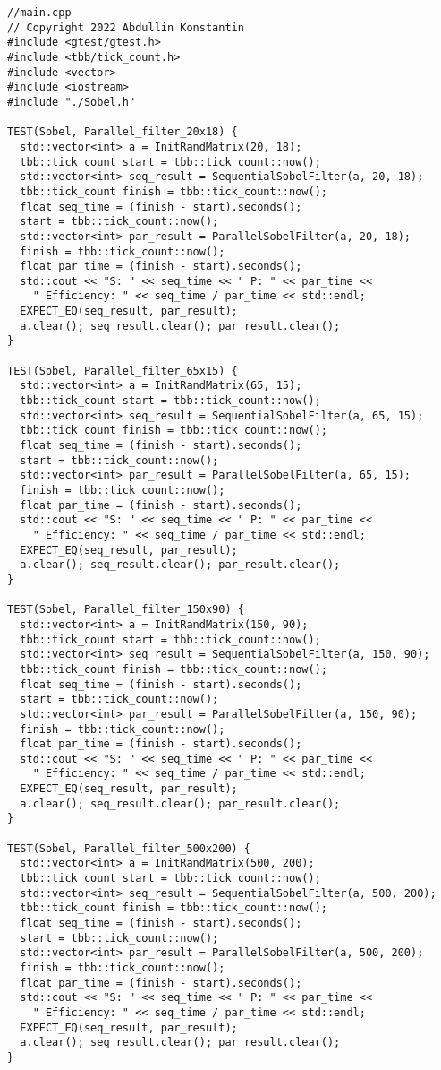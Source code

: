 \documentclass[12pt]{article}
\begin{document}
\begin{lstlisting}
//main.cpp
// Copyright 2022 Abdullin Konstantin
#include <gtest/gtest.h>
#include <tbb/tick_count.h>
#include <vector>
#include <iostream>
#include "./Sobel.h"

TEST(Sobel, Parallel_filter_20x18) {
  std::vector<int> a = InitRandMatrix(20, 18);
  tbb::tick_count start = tbb::tick_count::now();
  std::vector<int> seq_result = SequentialSobelFilter(a, 20, 18);
  tbb::tick_count finish = tbb::tick_count::now();
  float seq_time = (finish - start).seconds();
  start = tbb::tick_count::now();
  std::vector<int> par_result = ParallelSobelFilter(a, 20, 18);
  finish = tbb::tick_count::now();
  float par_time = (finish - start).seconds();
  std::cout << "S: " << seq_time << " P: " << par_time <<
    " Efficiency: " << seq_time / par_time << std::endl;
  EXPECT_EQ(seq_result, par_result);
  a.clear(); seq_result.clear(); par_result.clear();
}

TEST(Sobel, Parallel_filter_65x15) {
  std::vector<int> a = InitRandMatrix(65, 15);
  tbb::tick_count start = tbb::tick_count::now();
  std::vector<int> seq_result = SequentialSobelFilter(a, 65, 15);
  tbb::tick_count finish = tbb::tick_count::now();
  float seq_time = (finish - start).seconds();
  start = tbb::tick_count::now();
  std::vector<int> par_result = ParallelSobelFilter(a, 65, 15);
  finish = tbb::tick_count::now();
  float par_time = (finish - start).seconds();
  std::cout << "S: " << seq_time << " P: " << par_time <<
    " Efficiency: " << seq_time / par_time << std::endl;
  EXPECT_EQ(seq_result, par_result);
  a.clear(); seq_result.clear(); par_result.clear();
}

TEST(Sobel, Parallel_filter_150x90) {
  std::vector<int> a = InitRandMatrix(150, 90);
  tbb::tick_count start = tbb::tick_count::now();
  std::vector<int> seq_result = SequentialSobelFilter(a, 150, 90);
  tbb::tick_count finish = tbb::tick_count::now();
  float seq_time = (finish - start).seconds();
  start = tbb::tick_count::now();
  std::vector<int> par_result = ParallelSobelFilter(a, 150, 90);
  finish = tbb::tick_count::now();
  float par_time = (finish - start).seconds();
  std::cout << "S: " << seq_time << " P: " << par_time <<
    " Efficiency: " << seq_time / par_time << std::endl;
  EXPECT_EQ(seq_result, par_result);
  a.clear(); seq_result.clear(); par_result.clear();
}

TEST(Sobel, Parallel_filter_500x200) {
  std::vector<int> a = InitRandMatrix(500, 200);
  tbb::tick_count start = tbb::tick_count::now();
  std::vector<int> seq_result = SequentialSobelFilter(a, 500, 200);
  tbb::tick_count finish = tbb::tick_count::now();
  float seq_time = (finish - start).seconds();
  start = tbb::tick_count::now();
  std::vector<int> par_result = ParallelSobelFilter(a, 500, 200);
  finish = tbb::tick_count::now();
  float par_time = (finish - start).seconds();
  std::cout << "S: " << seq_time << " P: " << par_time <<
    " Efficiency: " << seq_time / par_time << std::endl;
  EXPECT_EQ(seq_result, par_result);
  a.clear(); seq_result.clear(); par_result.clear();
}


\end{lstlisting}
\end{document}

